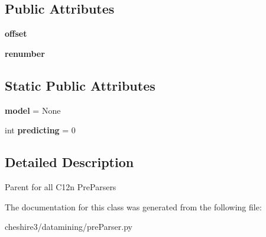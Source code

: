 \subsection*{Public Attributes}
\begin{DoxyCompactItemize}
\item 
\hypertarget{classcheshire3_1_1datamining_1_1pre_parser_1_1_classification_pre_parser_a06b80afe580e5295503a92ef39a698af}{{\bfseries offset}}\label{classcheshire3_1_1datamining_1_1pre_parser_1_1_classification_pre_parser_a06b80afe580e5295503a92ef39a698af}

\item 
\hypertarget{classcheshire3_1_1datamining_1_1pre_parser_1_1_classification_pre_parser_a72197751f6e7c39f824a9d2fce9bdf28}{{\bfseries renumber}}\label{classcheshire3_1_1datamining_1_1pre_parser_1_1_classification_pre_parser_a72197751f6e7c39f824a9d2fce9bdf28}

\end{DoxyCompactItemize}
\subsection*{Static Public Attributes}
\begin{DoxyCompactItemize}
\item 
\hypertarget{classcheshire3_1_1datamining_1_1pre_parser_1_1_classification_pre_parser_aed25d5cbed3ff92bb5669d652f8c9f6d}{{\bfseries model} = None}\label{classcheshire3_1_1datamining_1_1pre_parser_1_1_classification_pre_parser_aed25d5cbed3ff92bb5669d652f8c9f6d}

\item 
\hypertarget{classcheshire3_1_1datamining_1_1pre_parser_1_1_classification_pre_parser_a8da942d82598ef4649b4e990c60029d7}{int {\bfseries predicting} = 0}\label{classcheshire3_1_1datamining_1_1pre_parser_1_1_classification_pre_parser_a8da942d82598ef4649b4e990c60029d7}

\end{DoxyCompactItemize}


\subsection{Detailed Description}
\begin{DoxyVerb}Parent for all C12n PreParsers \end{DoxyVerb}
 

The documentation for this class was generated from the following file\-:\begin{DoxyCompactItemize}
\item 
cheshire3/datamining/pre\-Parser.\-py\end{DoxyCompactItemize}

